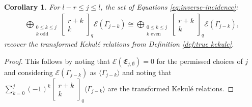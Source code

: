 \documentclass[12pt]{amsart}
\newtheorem{corollary}[theorem]{Corollary}
\theoremstyle{definition}
\theoremstyle{remark}
\numberwithin{equation}{section}
\numberwithin{figure}{section}
\newcommand{\osum}{\bigoplus}
\begin{document}
\begin{corollary}\label{cor:equiv to kekule in kar}
    For $l - r \leq j \leq l$, the set of Equations \eqref{eq:inverse-incidence}:
    \begin{align*}
   \osum_{\substack{0\leq k\leq j\\ k\text{ odd}}} \begin{bmatrix}r+k\\k\end{bmatrix}_q \mathcal E(\Gamma_{j-k})
 \cong \osum_{\substack{0\leq k\leq j\\ k\text{ even}}}  \begin{bmatrix}r+k\\k\end{bmatrix}_q \mathcal E(\Gamma_{j-k}),
\end{align*}
recover the transformed Kekulé relations from Definition \ref{def:true kekule}.
\end{corollary}
\begin{proof}
    This follows by noting that $\mathcal E(\mathfrak{E}_{j,\emptyset})=0$ for the permissed choices of $j$ and considering $\mathcal E(\Gamma_{j-k})$ as $ \langle \Gamma_{j-k} \rangle$ and noting that $\sum_{k=0}^{j}(-1)^k 
    \begin{bmatrix} r+k\\k \end{bmatrix}_q \langle\Gamma_{j-k}\rangle$  are the transformed Kekulé relations.
\end{proof}
\end{document}
